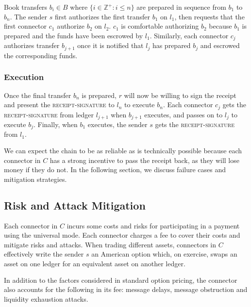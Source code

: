 \documentclass[letterpaper,twocolumn,10pt]{article}
\begin{document}
Book transfers $b_i \in B$ where $ \{ i \in \mathbb{Z}^+ : i \leq n \} $ are prepared in sequence from $b_1$ to $b_n$. The sender $s$ first authorizes the first transfer $b_1$ on $l_1$, then requests that the first connector $c_1$ authorize $b_2$ on $l_2$. $c_1$ is comfortable authorizing $b_2$ because $b_1$ is prepared and the funds have been escrowed by $l_1$. Similarly, each connector $c_j$ authorizes transfer $b_{j+1}$ once it is notified that $l_j$ has prepared $b_j$ and escrowed the corresponding funds.

\subsubsection{Execution}

Once the final transfer $b_n$ is prepared, $r$ will now be willing to sign the receipt and present the \textsc{receipt-signature} to $l_n$ to execute $b_n$. Each connector $c_j$ gets the \textsc{receipt-signature} from ledger $l_{j+1}$ when $b_{j+1}$ executes, and passes on to $l_j$ to execute $b_j$. Finally, when $b_1$ executes, the sender $s$ gets the \textsc{receipt-signature} from $l_1$.

We can expect the chain to be as reliable as is technically possible because each connector in $C$ has a strong incentive to pass the receipt back, as they will lose money if they do not. In the following section, we discuss failure cases and mitigation strategies.

\subsection{Risk and Attack Mitigation}
\label{subsec:fees}

Each connector in $C$ incurs some costs and risks for participating in a payment using the universal mode. Each connector charges a fee to cover their costs and mitigate risks and attacks. When trading different assets, connectors in $C$ effectively write the sender $s$ an American option \cite{black1973pricing}\cite{brennan1977valuation}
which, on exercise, swaps an asset on one ledger for an equivalent asset on another ledger.


In addition to the factors considered in standard option pricing, the connector also accounts for the following in its fee: message delays, message obstruction and liquidity exhaustion attacks.
\end{document}
